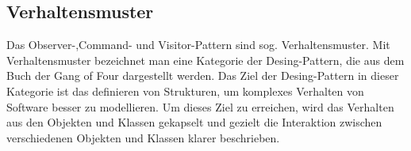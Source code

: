 

\subsection{Verhaltensmuster}

Das Observer-,Command- und Visitor-Pattern sind sog. Verhaltensmuster.
Mit Verhaltensmuster bezeichnet man eine Kategorie der Desing-Pattern, die aus dem Buch der Gang of Four dargestellt werden. Das Ziel der Desing-Pattern in dieser Kategorie ist das definieren von Strukturen, um komplexes Verhalten von Software besser zu modellieren. Um dieses Ziel zu erreichen, wird das Verhalten aus den Objekten und Klassen gekapselt und gezielt die Interaktion zwischen verschiedenen Objekten und Klassen klarer beschrieben.


